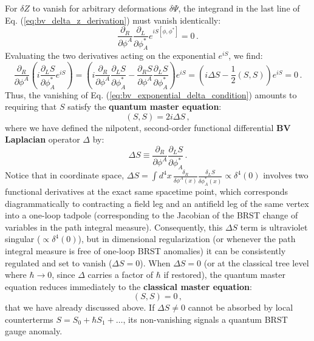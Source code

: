 For \(\delta Z\) to vanish for arbitrary deformations \(\delta\Psi\), the integrand in the last line of Eq. (\ref{eq:bv_delta_z_derivation}) must vanish identically:
\begin{equation} \label{eq:bv_exponential_delta_condition}
    \frac{\partial_R}{\partial \phi^A} \frac{\partial_L}{\partial \phi_A^*} e^{iS[\phi, \phi^*]} = 0 \, .
\end{equation}
Evaluating the two derivatives acting on the exponential \(e^{iS}\), we find:
\[
    \frac{\partial_R}{\partial \phi^A} \left( i \frac{\partial_L S}{\partial \phi_A^*} e^{iS} \right) = \left( i \frac{\partial_R}{\partial \phi^A} \frac{\partial_L S}{\partial \phi_A^*} - \frac{\partial_R S}{\partial \phi^A} \frac{\partial_L S}{\partial \phi_A^*} \right) e^{iS} = \left( i \Delta S - \frac{1}{2}(S, S) \right) e^{iS} = 0 \, .
\]
Thus, the vanishing of Eq. (\ref{eq:bv_exponential_delta_condition}) amounts to requiring that \(S\) satisfy the \textbf{quantum master equation}:
\begin{equation} \label{eq:quantum_master_equation}
    \boxed{(S, S) = 2i \Delta S} \, ,
\end{equation}
where we have defined the nilpotent, second-order functional differential \textbf{BV Laplacian} operator \(\Delta\) by:
\begin{equation} \label{eq:bv_laplacian_def}
    \Delta S \equiv \frac{\partial_R}{\partial \phi^A} \frac{\partial_L S}{\partial \phi_A^*} \, .
\end{equation}
Notice that in coordinate space, \(\Delta S = \int d^4x \, \frac{\delta_R}{\delta \phi^A(x)} \frac{\delta_L S}{\delta \phi_A^*(x)} \propto \delta^4(0)\) involves two functional derivatives at the exact same spacetime point, which corresponds diagrammatically to contracting a field leg and an antifield leg of the same vertex into a one-loop tadpole (corresponding to the Jacobian of the BRST change of variables in the path integral measure). Consequently, this \(\Delta S\) term is ultraviolet singular (\(\propto \delta^4(0)\)), but in dimensional regularization (or whenever the path integral measure is free of one-loop BRST anomalies) it can be consistently regulated and set to vanish (\(\Delta S = 0\)). When \(\Delta S = 0\) (or at the classical tree level where \(\hbar \rightarrow 0\), since \(\Delta\) carries a factor of \(\hbar\) if restored), the quantum master equation reduces immediately to the \textbf{classical master equation}:
\begin{equation} \label{eq:classical_master_eq_recovered}
    (S, S) = 0 \, ,
\end{equation}
that we have already discussed above. If \(\Delta S \neq 0\) cannot be absorbed by local counterterms \(S = S_0 + \hbar S_1 + \dots\), its non-vanishing signals a quantum BRST gauge anomaly.


